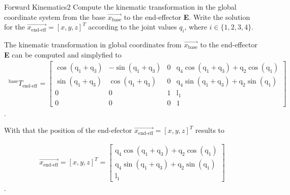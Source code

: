 \begin{questions}


\begin{question}{Forward Kinematics}{2}
Compute the kinematic transformation in the global coordinate system from the base $\vec{x_\textrm{base}}$ to the end-effector \textbf{E}.  
Write the solution for the $\vec{x_\textrm{end-eff}}=[x,y,z]^T$  according to the joint values $q_i$, where $i \in \{1,2,3,4\}$.

\begin{answer}
The kinematic transformation in global coordinates from  $\vec{x_\textrm{base}}$ to the end-effector \textbf{E} can be computed and simplyfied to
\begin{align*}
~^\textrm{base}\!T_{\textrm{end-eff}} &= 
\begin{bmatrix}
\cos(\textrm{q}_{\textrm{1}}+\textrm{q}_{\textrm{3}}) & -\sin(\textrm{q}_{\textrm{1}}+\textrm{q}_{\textrm{3}})& 0 & \textrm{q}_{\textrm{4}}\cos(\textrm{q}_{\textrm{1}}+\textrm{q}_{\textrm{3}}) + \textrm{q}_{\textrm{2}}\cos(\textrm{q}_{\textrm{1}}) \\
\sin(\textrm{q}_{\textrm{1}}+\textrm{q}_{\textrm{3}}) &\cos(\textrm{q}_{\textrm{1}}+\textrm{q}_{\textrm{3}})  & 0 & \textrm{q}_{\textrm{4}}\sin(\textrm{q}_{\textrm{1}}+\textrm{q}_{\textrm{3}}) + \textrm{q}_{\textrm{2}}\sin(\textrm{q}_{\textrm{1}}) \\
0 & 0 & 1 & \textrm{l}_{\textrm{1}} \\
0 & 0 & 0 & 1 
\end{bmatrix}
\end{align*}.

With that the position of the end-efector $\vec{x_\textrm{end-eff}}=[x,y,z]^T$ results to

\begin{align*}
\vec{x_\textrm{end-eff}}=[x,y,z]^T = \begin{bmatrix}
\textrm{q}_{\textrm{4}}\cos(\textrm{q}_{\textrm{1}}+\textrm{q}_{\textrm{3}}) + \textrm{q}_{\textrm{2}}\cos(\textrm{q}_{\textrm{1}}) \\
\textrm{q}_{\textrm{4}}\sin(\textrm{q}_{\textrm{1}}+\textrm{q}_{\textrm{3}}) + \textrm{q}_{\textrm{2}}\sin(\textrm{q}_{\textrm{1}}) \\
\textrm{l}_{\textrm{1}} 
\end{bmatrix}
\end{align*}.


\end{answer}
\end{question}
\end{questions}
